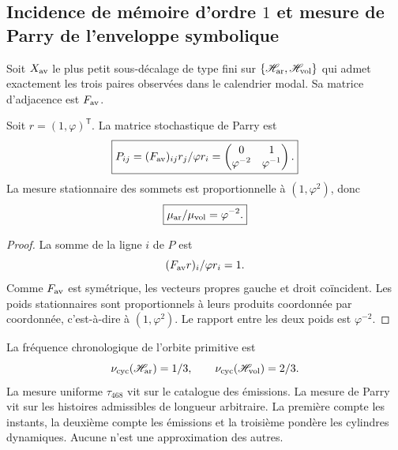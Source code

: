 \subsection{Incidence de mémoire d’ordre \(1\) et mesure de Parry de l’enveloppe symbolique}

Soit \(X_{\rm av}\) le plus petit sous-décalage de type fini sur
\(\{\mathscr H_{\rm ar},\mathscr H_{\rm vol}\}\) qui admet exactement
les trois paires observées dans le calendrier modal. Sa matrice d’adjacence est
\(F_{\rm av}\).

\begin{theorem}
\label{p12-83-c9-s3:thm:parry-phi}
Soit \(r=(1,\varphi)^{\mathsf T}\). La matrice stochastique de Parry est
\begin{equation}
 \boxed{
 P_{ij}=
 \frac{(F_{\rm av})_{ij}r_j}{\varphi r_i}
 =
 \begin{pmatrix}
 0&1\\
 \varphi^{-2}&\varphi^{-1}
 \end{pmatrix}.}
 \label{p12-83-c9-s3:eq:parry-matriz-phi}
\end{equation}
La mesure stationnaire des sommets est proportionnelle à
\((1,\varphi^2)\), donc
\begin{equation}
 \boxed{
 \frac{\mu_{\rm ar}}{\mu_{\rm vol}}=\varphi^{-2}.}
 \label{p12-83-c9-s3:eq:parry-razon-phi}
\end{equation}
\end{theorem}

\begin{proof}
La somme de la ligne \(i\) de \(P\) est
\[
 \frac{(F_{\rm av}r)_i}{\varphi r_i}=1.
\]
Comme \(F_{\rm av}\) est symétrique, les vecteurs propres gauche et droit
coïncident. Les poids stationnaires sont proportionnels à leurs produits
coordonnée par coordonnée, c’est-à-dire à \((1,\varphi^2)\). Le rapport entre les
deux poids est \(\varphi^{-2}\).
\end{proof}

\begin{remark}
La fréquence chronologique de l’orbite primitive est
\[
 \nu_{\rm cyc}(\mathscr H_{\rm ar})=\frac13,
 \qquad
 \nu_{\rm cyc}(\mathscr H_{\rm vol})=\frac23.
\]
La mesure uniforme \(\tau_{468}\) vit sur le catalogue des émissions. La
mesure de Parry vit sur les histoires admissibles de longueur arbitraire. La
première compte les instants, la deuxième compte les émissions et la troisième pondère
les cylindres dynamiques. Aucune n’est une approximation des autres.
\end{remark}

